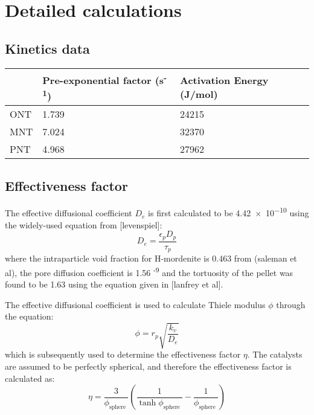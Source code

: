 \section{Detailed calculations}
\label{app:reaction}
\subsection{Kinetics data}

\begin{table}[h]
\centering
\label{tab:cwtable}
\begin{tabular}{@{}lll@{}}
\toprule
 & Pre-exponential factor (s\textsuperscript{-1}) & Activation Energy (J/mol) \\ \midrule
ONT & 1.739 & 24215 \\
MNT & 7.024 & 32370 \\
PNT & 4.968 & 27962 \\ \bottomrule
\end{tabular}
\end{table}

\subsection{Effectiveness factor}

The effective diffusional coefficient $D_e$ is first calculated to be \num{4.42e-10} using the widely-used equation from [levenspiel]: 
\begin{equation}
    D_e = \frac{\epsilon_p D_p}{\tau_p}
\end{equation}
where the intraparticle void fraction for H-mordenite is 0.463 from (saleman et al), the pore diffusion coefficient is 1.56 \textsuperscript{-9} and the tortuosity of the pellet was found to be 1.63 using the equation given in [lanfrey et al]. 

The effective diffusional coefficient is used to calculate Thiele modulus $\phi$ through the equation:
\begin{equation}
    \phi = r_p \sqrt{\frac{k_v}{D_e}}
\end{equation}
which is subsequently used to determine the effectiveness factor $\eta$. The catalysts are assumed to be perfectly spherical, and therefore the effectiveness factor is calculated as: 
\begin{equation}
\eta=\frac{3}{\phi_{\text {sphere }}}\left(\frac{1}{\tanh \phi_{\text {sphere }}}-\frac{1}{\phi_{\text {sphere }}}\right)
\end{equation}

